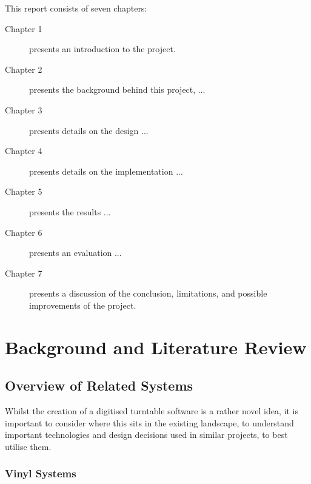       This report consists of seven chapters:
      \begin{description}
      \item[Chapter 1] presents an introduction to the project.
      \item[Chapter 2] presents the background behind this project, ...
      \item[Chapter 3] presents details on the design ...
      \item[Chapter 4] presents details on the implementation ...
      \item[Chapter 5] presents the results ...
      \item[Chapter 6] presents an evaluation  ...
      \item[Chapter 7] presents a discussion of the conclusion, limitations, and possible improvements of the project.
    \end{description}
    
    
    \section{Background and Literature Review} %
    
      \subsection{Overview of Related Systems}
    
        Whilst the creation of a digitised turntable software is a rather novel idea, it is important to consider where this sits in the existing landscape, to understand important technologies and design decisions used in similar projects, to best utilise them.
      
        \subsubsection{Vinyl Systems}
    
